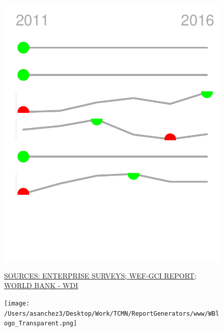 \documentclass{article}\usepackage[]{graphicx}\usepackage[]{color}
\makeatletter
\def\maxwidth{ %
  \ifdim\Gin@nat@width>\linewidth
    \linewidth
  \else
    \Gin@nat@width
  \fi
}
\makeatother
\begin{document}
\begin{figure}
\begin{minipage}[c]{0.95\textwidth}
\begin{minipage}[c]{0.125\textwidth}
{\centering \includegraphics[width=\maxwidth]{figure/sparklines_Supports-1} 

}



    \vspace*{-0.5cm}
  \end{minipage}
  
  \vspace{-1ex}
  \scriptsize{\href{http://www.enterprisesurveys.org/data/exploretopics/innovation-and-technology}{\textcolor[HTML]{22A6F5}{SOURCES: ENTERPRISE SURVEYS; }}\href{http://www3.weforum.org/docs/gcr/2015-2016/GCI_Dataset_2006-2015.xlsx}{\textcolor[HTML]{22A6F5}{WEF-GCI REPORT; }}\href{http://data.worldbank.org}{\textcolor[HTML]{22A6F5}{WORLD BANK - WDI}}}
\end{minipage}

  \vspace{4ex}
  \begin{minipage}[c]{0.33\textwidth}
    \hspace*{+0.3cm} \texttt{[image: /Users/asanchez3/Desktop/Work/TCMN/ReportGenerators/www/WBlogo\_Transparent.png]}
  \end{minipage}
  \begin{minipage}[c]{0.65\textwidth}
    \vspace*{-0.1cm}
  \end{minipage}
\end{figure}
\end{document}

